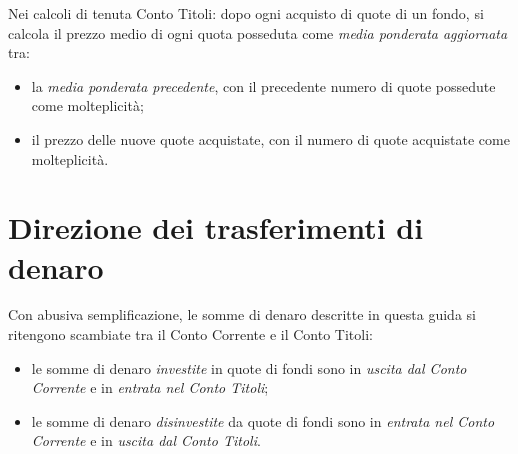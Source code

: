 \documentclass[12pt,a4paper]{article}
\begin{document}
Nei calcoli  di tenuta  Conto Titoli:  dopo ogni acquisto  di quote  di un  fondo, si
calcola  il  prezzo  medio  di   ogni  quota  posseduta  come  \emph{media  ponderata
   aggiornata} tra:
\begin{itemize}
\item  la  \emph{media ponderata  precedente},  con  il  precedente numero  di  quote
  possedute come molteplicità;
\item il prezzo delle nuove quote acquistate,  con il numero di quote acquistate come
  molteplicità.
\end{itemize}


\section{Direzione dei trasferimenti di denaro}


Con  abusiva  semplificazione, le  somme  di  denaro  descritte  in questa  guida  si
ritengono scambiate tra il Conto Corrente e il Conto Titoli:
\begin{itemize}
\item le somme di denaro \emph{investite} in  quote di fondi sono in \emph{uscita dal
     Conto Corrente} e in \emph{entrata nel Conto Titoli};
\item le somme di denaro \emph{disinvestite}  da quote di fondi sono in \emph{entrata
     nel Conto Corrente} e in \emph{uscita dal Conto Titoli}.
\end{itemize}
\end{document}
